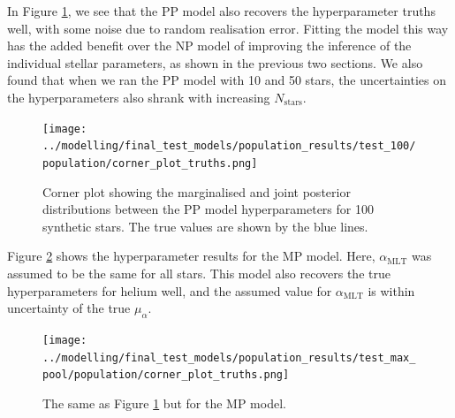 \documentclass[a4paper,fleqn,usenatbib]{mnras}
\newcommand{\mlt}{\ensuremath{{\alpha_\mathrm{MLT}}}}
\begin{document}

In Figure \ref{fig:test-corners-pp}, we see that the PP model also recovers the hyperparameter truths well, with some noise due to random realisation error. Fitting the model this way has the added benefit over the NP model of improving the inference of the individual stellar parameters, as shown in the previous two sections. We also found that when we ran the PP model with 10 and 50 stars, the uncertainties on the hyperparameters also shrank with increasing $N_\mathrm{stars}$.

\begin{figure}
    \centering
    \texttt{[image: ../modelling/final\_test\_models/population\_results/test\_100/population/corner\_plot\_truths.png]}
    \caption{Corner plot showing the marginalised and joint posterior distributions between the PP model hyperparameters for 100 synthetic stars. The true values are shown by the blue lines.}  
    \label{fig:test-corners-pp}   
\end{figure}

Figure \ref{fig:test-corners-mp} shows the hyperparameter results for the MP model. Here, $\mlt$ was assumed to be the same for all stars. This model also recovers the true hyperparameters for helium well, and the assumed value for $\mlt$ is within uncertainty of the true $\mu_\alpha$.

\begin{figure}
    \centering
    \texttt{[image: ../modelling/final\_test\_models/population\_results/test\_max\_pool/population/corner\_plot\_truths.png]}
    \caption{The same as Figure \ref{fig:test-corners-pp} but for the MP model.}
    \label{fig:test-corners-mp} 
\end{figure}

\end{document}
